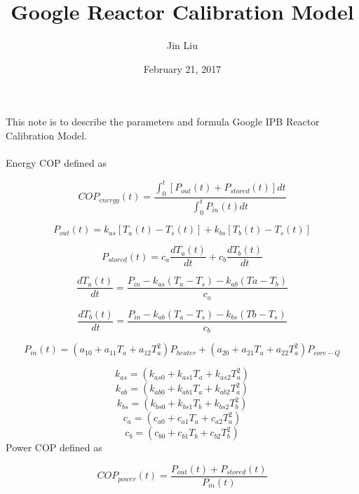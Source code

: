 \documentclass{article}
\title{Google Reactor Calibration Model}
\author{Jin Liu}
\date{February 21, 2017}
\begin{document}
\maketitle

This note is to describe the parameters and formula Google IPB Reactor Calibration Model.\\
\\
Energy COP defined as

\begin{equation}
COP_{energy}(t)=\frac{\int_{0}^{t}{[P_{out}(t)+P_{stored}(t)]dt}}{\int_{0}^{t}P_{in}(t)dt}\label{1}%
\end{equation}

\begin{equation}
P_{out}(t)=k_{as}[T_{a}(t)-T_{s}(t)]+k_{bs}[T_{b}(t)-T_{s}(t)]\label{1}%
\end{equation}  

\begin{equation}
P_{stored}(t)=c_{a}\frac{dT_{a}(t)}{dt}+c_{b}\frac{dT_{b}(t)}{dt}\label{1}%
\end{equation}  

\begin{equation}
\frac{dT_{a}(t)}{dt}=\frac{P_{in}-k_{as}(T_{a}-T_{s})-k_{ab}(T{a}-T_{b})}{c_{a}}\label{1}%
\end{equation} 

\begin{equation}
\frac{dT_{b}(t)}{dt}=\frac{P_{in}-k_{ab}(T_{a}-T_{s})-k_{bs}(T{b}-T_{s})}{c_{b}}\label{1}%
\end{equation} 

\begin{equation}
P_{in}(t)=(a_{10}+a_{11}T_{a}+a_{12}T_{a}^{2})P_{heater} + (a_{20}+a_{21}T_{a}+a_{22}T_{a}^{2})P_{core-Q}\label{1}%
\end{equation}  

\begin{equation}
k_{as}=(k_{as0}+k_{as1}T_{a}+k_{as2}T_{a}^{2})\label{1}%
\end{equation}  
\begin{equation}
k_{ab}=(k_{ab0}+k_{ab1}T_{a}+k_{ab2}T_{a}^{2})
\end{equation}  
\begin{equation}
k_{bs}=(k_{bs0}+k_{bs1}T_{b}+k_{bs2}T_{b}^{2})
\end{equation}  
\begin{equation}
c_{a}=(c_{a0}+c_{a1}T_{a}+c_{a2}T_{a}^{2})
\end{equation}  
\begin{equation}
c_{b}=(c_{b0}+c_{b1}T_{b}+c_{b2}T_{b}^{2})
\end{equation}  
Power COP defined as

\begin{equation}
COP_{power}(t)=\frac{{P_{out}(t)+P_{stored}(t)}}{P_{in}(t)}\label{1}%
\end{equation}
\end{document}
